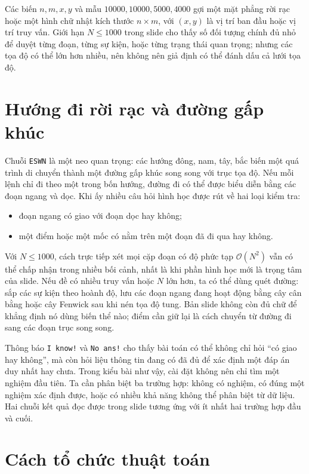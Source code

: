 \documentclass[11pt]{article}
\newcommand{\Oh}{\mathcal{O}}
\begin{document}
Các biến \(n,m,x,y\) và mẫu \(10000,10000,5000,4000\) gợi một mặt phẳng rời
rạc hoặc một hình chữ nhật kích thước \(n\times m\), với \((x,y)\) là vị trí
ban đầu hoặc vị trí truy vấn. Giới hạn \(N\le 1000\) trong slide cho thấy số
đối tượng chính đủ nhỏ để duyệt từng đoạn, từng sự kiện, hoặc từng trạng thái
quan trọng; nhưng các tọa độ có thể lớn hơn nhiều, nên không nên giả định có
thể đánh dấu cả lưới tọa độ.

\section{Hướng đi rời rạc và đường gấp khúc}

Chuỗi \texttt{ESWN} là một neo quan trọng: các hướng đông, nam, tây, bắc biến
một quá trình di chuyển thành một đường gấp khúc song song với trục tọa độ.
Nếu mỗi lệnh chỉ đi theo một trong bốn hướng, đường đi có thể được biểu diễn
bằng các đoạn ngang và dọc. Khi ấy nhiều câu hỏi hình học được rút về hai
loại kiểm tra:
\begin{itemize}
  \item đoạn ngang có giao với đoạn dọc hay không;
  \item một điểm hoặc một mốc có nằm trên một đoạn đã đi qua hay không.
\end{itemize}

Với \(N\le 1000\), cách trực tiếp xét mọi cặp đoạn có độ phức tạp
\(\Oh(N^2)\) vẫn có thể chấp nhận trong nhiều bối cảnh, nhất là khi phần hình
học mới là trọng tâm của slide. Nếu đề có nhiều truy vấn hoặc \(N\) lớn hơn,
ta có thể dùng quét đường: sắp các sự kiện theo hoành độ, lưu các đoạn ngang
đang hoạt động bằng cây cân bằng hoặc cây Fenwick sau khi nén tọa độ tung.
Bản slide không còn đủ chữ để khẳng định nó dùng biến thể nào; điểm cần giữ
lại là cách chuyển từ đường đi sang các đoạn trục song song.

Thông báo \texttt{I know!} và \texttt{No ans!} cho thấy bài toán có thể không
chỉ hỏi ``có giao hay không'', mà còn hỏi liệu thông tin đang có đã đủ để xác
định một đáp án duy nhất hay chưa. Trong kiểu bài như vậy, cài đặt không nên
chỉ tìm một nghiệm đầu tiên. Ta cần phân biệt ba trường hợp: không có nghiệm,
có đúng một nghiệm xác định được, hoặc có nhiều khả năng không thể phân biệt
từ dữ liệu. Hai chuỗi kết quả đọc được trong slide tương ứng với ít nhất hai
trường hợp đầu và cuối.

\section{Cách tổ chức thuật toán}
\end{document}
